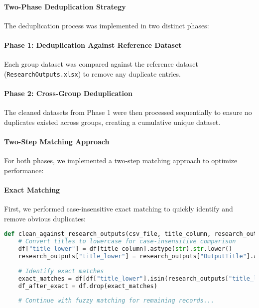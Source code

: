 \documentclass[12pt]{article}
\begin{document}
\paragraph{Two-Phase Deduplication
Strategy}\label{two-phase-deduplication-strategy}

The deduplication process was implemented in two distinct phases:

\paragraph{Phase 1: Deduplication Against Reference
Dataset}\label{phase-1-deduplication-against-reference-dataset}

Each group dataset was compared against the reference dataset
(\texttt{ResearchOutputs.xlsx}) to remove any duplicate entries.

\paragraph{Phase 2: Cross-Group
Deduplication}\label{phase-2-cross-group-deduplication}

The cleaned datasets from Phase 1 were then processed sequentially to
ensure no duplicates existed across groups, creating a cumulative unique
dataset.

\paragraph{Two-Step Matching
Approach}\label{two-step-matching-approach}

For both phases, we implemented a two-step matching approach to optimize
performance:

\paragraph{Exact Matching}\label{exact-matching}

First, we performed case-insensitive exact matching to quickly identify
and remove obvious duplicates:

\begin{lstlisting}[language=Python]
def clean_against_research_outputs(csv_file, title_column, research_outputs, threshold=85):
    # Convert titles to lowercase for case-insensitive comparison
    df["title_lower"] = df[title_column].astype(str).str.lower()
    research_outputs["title_lower"] = research_outputs["OutputTitle"].astype(str).str.lower()
    
    # Identify exact matches
    exact_matches = df[df["title_lower"].isin(research_outputs["title_lower"])].index
    df_after_exact = df.drop(exact_matches)
    
    # Continue with fuzzy matching for remaining records...
\end{lstlisting}
\end{document}
